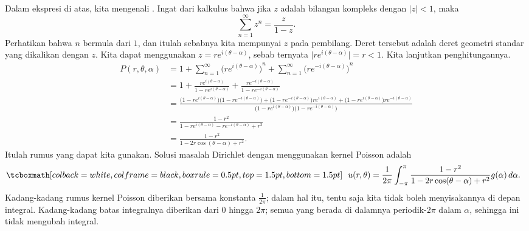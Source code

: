 Dalam ekspresi di atas, kita mengenali
\emph{}.
Ingat dari kalkulus bahwa jika $z$ adalah bilangan kompleks dengan $\lvert z \rvert < 1$, maka
\begin{equation*}
\sum_{n=1}^\infty z^n = \frac{z}{1-z} .
\end{equation*}
Perhatikan bahwa $n$ bermula dari $1$, dan itulah sebabnya kita mempunyai $z$ pada pembilang.
Deret tersebut adalah deret geometri standar yang dikalikan dengan $z$.
Kita dapat menggunakan $z = re^{i(\theta-\alpha)}$, sebab
ternyata $\lvert re^{i(\theta-\alpha)} \rvert = r < 1$.
Kita lanjutkan penghitungannya.
\begin{equation*}
\begin{split}
P(r,\theta,\alpha)
& =
1
+
\sum_{n=1}^\infty
{\bigl(
re^{i(\theta-\alpha)}\bigr)}^{n}
+
\sum_{n=1}^\infty
{\bigl(
re^{-i(\theta-\alpha)}\bigr)}^{n}
\\
& =
1
+
\frac{re^{i(\theta-\alpha)}}{1-re^{i(\theta-\alpha)}}
+
\frac{re^{-i(\theta-\alpha)}}{1-re^{-i(\theta-\alpha)}}
\\
& = 
\frac{
\bigl(1-re^{i(\theta-\alpha)}\bigr)\bigl(1-re^{-i(\theta-\alpha)}\bigr)
+
\bigl(1-re^{-i(\theta-\alpha)}\bigr)re^{i(\theta-\alpha)} +
\bigl(1-re^{i(\theta-\alpha)}\bigr)re^{-i(\theta-\alpha)}}
{\bigl(1-re^{i(\theta-\alpha)}\bigr)\bigl(1-re^{-i(\theta-\alpha)}\bigr)}
\\
& = 
\frac{1 -r^2}{1 - re^{i(\theta-\alpha)} - re^{-i(\theta-\alpha)} +r^2}
\\
& = 
\frac{1 -r^2}{1 - 2r\cos(\theta-\alpha) +r^2} .
\end{split}
\end{equation*}
Itulah rumus yang dapat kita gunakan.  Solusi
masalah Dirichlet dengan menggunakan kernel Poisson adalah
\begin{equation*}
\mybxbg{~~
u(r,\theta) = 
\frac{1}{2\pi} \int_{-\pi}^{\pi}
\frac{1 -r^2}{1 - 2r\cos(\theta-\alpha) +r^2} g(\alpha) \, d\alpha .
~~}
\end{equation*}
Kadang-kadang rumus kernel Poisson
diberikan bersama konstanta $\frac{1}{2\pi}$; dalam hal itu, tentu saja kita
tidak boleh menyisakannya di depan integral.
Kadang-kadang batas
integralnya diberikan dari 0 hingga $2\pi$; semua yang berada di dalamnya
periodik-$2\pi$ dalam $\alpha$, sehingga ini tidak mengubah integral.


